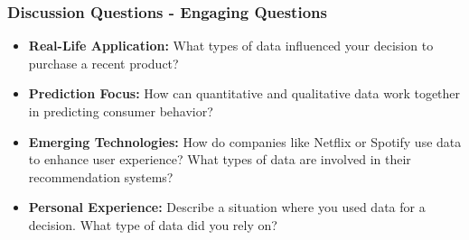 \documentclass[aspectratio=169]{beamer}
\begin{document}
\begin{frame}[fragile]
    \frametitle{Discussion Questions - Engaging Questions}
    \begin{itemize}
        \item \textbf{Real-Life Application:} What types of data influenced your decision to purchase a recent product?
        \item \textbf{Prediction Focus:} How can quantitative and qualitative data work together in predicting consumer behavior?
        \item \textbf{Emerging Technologies:} How do companies like Netflix or Spotify use data to enhance user experience? What types of data are involved in their recommendation systems?
        \item \textbf{Personal Experience:} Describe a situation where you used data for a decision. What type of data did you rely on?
    \end{itemize}
\end{frame}
\end{document}
